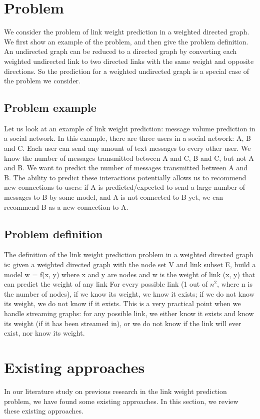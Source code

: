 \documentclass{article} %
\begin{document}
\section{Problem}
We consider the problem of link weight prediction in a weighted directed graph.
We first show an example of the problem,
and then give the problem definition.
An undirected graph can be reduced to a directed graph by converting each weighted undirected link to two directed links with the same weight and opposite directions.
So the prediction for a weighted undirected graph is a special case of the problem we consider.

\subsection{Problem example}
Let us look at an example of link weight prediction: message volume prediction in a social network.
In this example, there are three users in a social network: A, B and C.
Each user can send any amount of text messages to every other user.
We know the number of messages transmitted between A and C, B and C, but not A and B.
We want to predict the number of messages transmitted between A and B.
The ability to predict these interactions potentially allows us to recommend new connections to users:
if A is predicted/expected to send a large number of messages to B by some model,
and A is not connected to B yet,
we can recommend B as a new connection to A.

\subsection{Problem definition}
The definition of the link weight prediction problem in a weighted directed graph is: given a weighted directed graph with the node set V and link subset E, build a model w = f(x, y) where x and y are nodes and w is the weight of link (x, y) that can predict the weight of any link
For every possible link (1 out of $ n^2 $, where n is the number of nodes), 
if we know its weight, we know it exists;
if we do not know its weight, we do not know if it exists.
This is a very practical point when we handle streaming graphs:
for any possible link,
we either know it exists and know its weight (if it has been streamed in), or we do not know if the link will ever exist, nor know its weight.

\section{Existing approaches}
In our literature study on previous research in the link weight prediction problem,
we have found some existing approaches.
In this section, we review these existing approaches.
\end{document}
